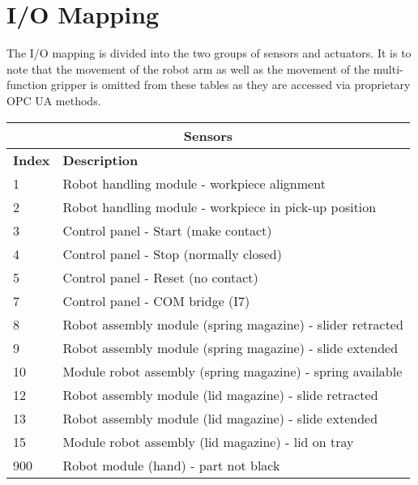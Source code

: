 \documentclass{article}
\begin{document}
\section{I/O Mapping}
The I/O mapping is divided into the two groups of sensors and actuators. It is to note that the movement of the robot arm as well as the movement of the multi-function gripper is omitted from these tables as they are accessed via proprietary OPC UA methods. 
\begin{table}
	\setlength\extrarowheight{4pt}
	\small
	\begin{tabularx}{\textwidth}{|p{1cm}|X|}
		\hline
		\multicolumn{2}{|c|}{\bf \color{black} \large Sensors}\\
		\hline\hline
		\bf Index & \bf Description\\
		\hline\hline
		1 & Robot handling module - workpiece alignment\\
		\hline
		2 & Robot handling module - workpiece in pick-up position\\
		\hline
		3 & Control panel - Start (make contact)\\
		\hline
		4 & Control panel - Stop (normally closed) \\
		\hline
		5 & Control panel - Reset (no contact)\\
		\hline
		7 & Control panel - COM bridge (I7)\\
		\hline
		8 & Robot assembly module (spring magazine) - slider retracted\\
		\hline
		9 & Robot assembly module (spring magazine) - slide extended\\
		\hline
		10 & Module robot assembly (spring magazine) - spring available \\
		\hline
		12 & Robot assembly module (lid magazine) - slide retracted\\
		\hline
		13 & Robot assembly module (lid magazine) - slide extended\\
		\hline
		15 & Module robot assembly (lid magazine) - lid on tray\\
		\hline
		900 & Robot module (hand) - part not black\\
		\hline
	\end{tabularx}


\end{table}
\end{document}
